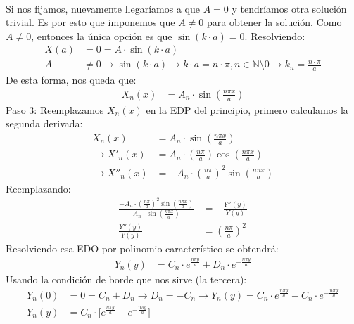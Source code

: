 \documentclass[
  11pt,
  letterpaper,
   answers
  ]{exam}
\begin{document}
\begin{questions}
\begin{solution}
\begin{parts}
\begin{align}
        \end{align}
        Si nos fijamos, nuevamente llegaríamos a que $A=0$ y tendríamos otra solución trivial. Es por esto que imponemos que $A \neq 0$ para obtener la solución. Como $A \neq 0$, entonces la única opción es que $\sin{(k \cdot a)} = 0$. Resolviendo:
        \begin{align}
            X(a) &= 0 = A \cdot \sin{(k \cdot a)} \\
            A &\neq 0 \rightarrow \sin{(k \cdot a)} \rightarrow k \cdot a = n \cdot \pi , n \in \mathbb{N} \setminus{0} \rightarrow k_n = \frac{n \cdot \pi}{a}
        \end{align}
        De esta forma, nos queda que:
        \begin{align}
            X_n(x) &= A_n\cdot \sin\!\left(\frac{n \pi x}{a}\right)
        \end{align}
        \underline{Paso 3:} Reemplazamos $X_n(x)$ en la EDP del principio, primero calculamos la segunda derivada:
        \begin{align}
            X_n(x) &= A_n\cdot \sin\!\left(\frac{n \pi x}{a}\right) \\
            \rightarrow X'_n(x) &= A_n\cdot \left(\frac{n \pi}{a}\right) \cos\!\left(\frac{n \pi x}{a}\right) \\
            \rightarrow X''_n(x) &= -A_n\cdot \left(\frac{n \pi}{a}\right)^2 \sin\!\left(\frac{n \pi x}{a}\right)
        \end{align}
        Reemplazando:
        \begin{align}
            \frac{-A_n\cdot \left(\frac{n \pi}{a}\right)^2 \sin\!\left(\frac{n \pi x}{a}\right)}{A_n\cdot \sin\!\left(\frac{n \pi x}{a}\right)} &= -\frac{Y''(y)}{Y(y)} \\
            \frac{Y''(y)}{Y(y)} &= \left(\frac{n \pi}{a}\right)^2
        \end{align}
        Resolviendo esa EDO por polinomio característico se obtendrá:
        \begin{align}
            Y_n(y) &= C_n \cdot e^{\frac{n \pi y}{a}} + D_n \cdot e^{-\frac{n \pi y}{a}}
        \end{align}
        Usando la condición de borde que nos sirve (la tercera):
        \begin{align}
            Y_n(0) &= 0 = C_n + D_n \rightarrow D_n = -C_n \rightarrow Y_n(y) = C_n \cdot e^{\frac{n \pi y}{a}} - C_n \cdot e^{-\frac{n \pi y}{a}} \\
            Y_n(y) &= C_n \cdot \bigl[e^{\frac{n \pi y}{a}} - e^{-\frac{n \pi y}{a}}\bigr]

\end{align}
\end{parts}
\end{solution}
\end{questions}
\end{document}
